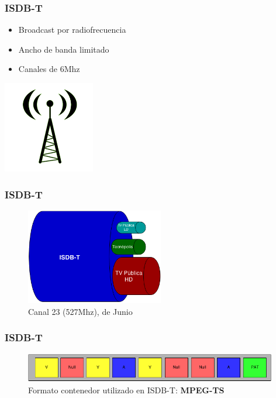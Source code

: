 \documentclass[a4paper,11pt]{beamer}
\begin{document}
\begin{frame}
\frametitle{ISDB-T}
\begin{center}
\begin{itemize}
\item Broadcast por radiofrecuencia
\item Ancho de banda limitado
\item Canales de 6Mhz
\end{itemize}
\includegraphics[width=4cm]{antenna.png}
\end{center}
\end{frame}


\begin{frame}
\frametitle{ISDB-T}
\begin{center}
\begin{figure}
  \includegraphics[width=6cm]{isdbtcable_regular.png} \caption{Canal 23 (527Mhz), de Junio}
\end{figure}
\end{center}
\end{frame}


\begin{frame}
\frametitle{ISDB-T}
\begin{center}
\begin{figure}
 \includegraphics[width=11cm]{ts.png} \caption{Formato contenedor utilizado en ISDB-T: \textbf{MPEG-TS}}
\end{figure}
\end{center}
\end{frame}
\end{document}
